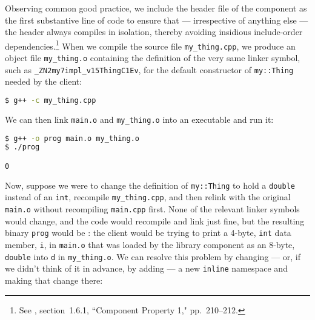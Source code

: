 \noindent Observing common good practice, we include the header file of the component
as the first substantive line of code to ensure that --- irrespective of
anything else --- the header always compiles in isolation, thereby
avoiding insidious include-order dependencies.{\cprotect\footnote{See
  \cite{lakos20}, section~1.6.1, ``Component Property 1," pp.~210--212.}} When we compile the source file \lstinline!my_thing.cpp!,
we produce an object file \lstinline!my_thing.o! containing the definition
of the very same linker symbol, such as
\lstinline!_ZN2my7impl_v15ThingC1Ev!, for the default constructor of
\lstinline!my::Thing! needed by the client:

\begin{lstlisting}[language=bash,style=plain]
$ g++ -c my_thing.cpp
\end{lstlisting}

\noindent We can then link \lstinline!main.o! and \lstinline!my_thing.o! into an
executable and run it:

\begin{lstlisting}[language=bash,style=plain]
$ g++ -o prog main.o my_thing.o
$ ./prog

0
\end{lstlisting}

\noindent Now, suppose we were to change the definition of \lstinline!my::Thing! to hold a \lstinline!double! instead of an \lstinline!int!, recompile
\lstinline!my_thing.cpp!, and then relink with the original
\lstinline!main.o! without recompiling \lstinline!main.cpp! first. None of the
relevant linker symbols would change, and the code would recompile and link
just fine, but the resulting binary \lstinline!prog! would be
: the client would be trying to print a 4-byte,
\lstinline!int! data member, \lstinline!i!, in \lstinline!main.o! that was loaded
by the library component as an 8-byte, \lstinline!double! into \lstinline!d!
in \lstinline!my_thing.o!. We can resolve this problem by changing --- or,
if we didn't think of it in advance, by adding --- a new \lstinline!inline!
namespace and making that change there:

